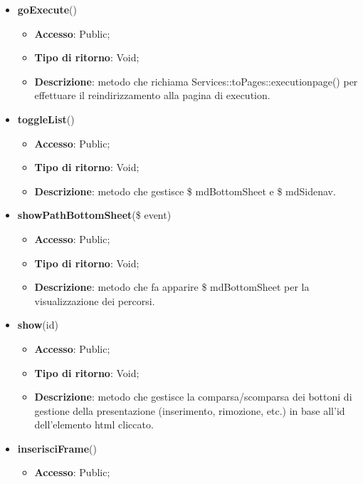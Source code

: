 {{\begin{itemize}
\begin{itemize}
			\item \textbf{Tipo di ritorno}: Void;
			\item \textbf{Descrizione}: metodo che richiama una funzione JavaScript per la traduzione dell'oggetto json, passato come parametro, in html permettendo all'utente di modificare la presentazione.
		\end{itemize}
		\item \textbf{goExecute}()
		\begin{itemize}
			\item \textbf{Accesso}: Public;
			\item \textbf{Tipo di ritorno}: Void;
			\item \textbf{Descrizione}: metodo che richiama Services::\-toPages::\-executionpage() per effettuare il reindirizzamento alla pagina di execution.
		\end{itemize}
		\item \textbf{toggleList}()
		\begin{itemize}
			\item \textbf{Accesso}: Public;
			\item \textbf{Tipo di ritorno}: Void;
			\item \textbf{Descrizione}: metodo che gestisce \$ mdBottomSheet e \$ mdSidenav.
		\end{itemize}
		\item \textbf{showPathBottomSheet}(\$ event)
		\begin{itemize}
			\item \textbf{Accesso}: Public;
			\item \textbf{Tipo di ritorno}: Void;
			\item \textbf{Descrizione}: metodo che fa apparire \$ mdBottomSheet per la visualizzazione dei percorsi.
		\end{itemize}
		\item \textbf{show}(id)
		\begin{itemize}
			\item \textbf{Accesso}: Public;
			\item \textbf{Tipo di ritorno}: Void;
			\item \textbf{Descrizione}: metodo che gestisce la comparsa/scomparsa dei bottoni di gestione della presentazione (inserimento, rimozione, etc.) in base all'id dell'elemento html cliccato.
		\end{itemize}
		\item \textbf{inserisciFrame}()
		\begin{itemize}
			\item \textbf{Accesso}: Public;

\end{itemize}
\end{itemize}}}
